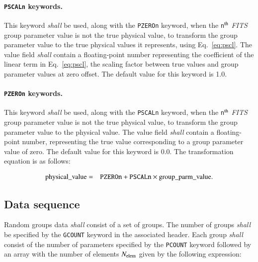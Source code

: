 \documentclass[onecolumn]{aa}
\begin{document}
   \paragraph{{\tt PSCALn} keywords.}
    \label{s:pscl}
   This keyword {\em shall} be used, along
   with the {\tt PZEROn}
   keyword, when the {\tt n}$^{\rm th}$ {\em FITS\/} group parameter 
   value is not the true
   physical value, to transform the 
   group parameter value to the true physical values it represents, 
   using Eq.~\ref{eq:pscl}. 
   The value field {\em shall} contain a floating-point number representing 
   the coefficient of the linear term in Eq.~\ref{eq:pscl}, the scaling 
   factor between true values and group parameter values 
   at zero offset.  The default value for this keyword is 1.0. 
  
   \paragraph{{\tt PZEROn} keywords.}
   \label{s:pzer}
   This keyword {\em shall} be used, along
   with the {\tt PSCALn} keyword, when 
   the {\tt n}$^{\rm th}$ {\em FITS\/} group parameter 
   value is not the true physical
   value, to transform the group parameter value to the physical value.  
   The value field {\em shall} contain a floating-point number,
   representing the true value corresponding to a group
   parameter value of zero.  The default value for this keyword is 0.0.  
   The transformation equation is as follows: 

\begin{eqnarray}  
    \mbox{physical\_value} & = & \mbox{{\tt PZEROn}} + \mbox{{\tt PSCALn}} 
                        \times \mbox{group\_parm\_value}. \label{eq:pscl}
\end{eqnarray}  
  
\subsection{Data sequence}
 \label{s:grdata}
  Random groups data {\em shall} consist of a set of groups.  The number of
  groups {\em shall} be specified by the {\tt GCOUNT} keyword in the associated
  header.  Each group {\em shall} consist of the number
  of
  parameters specified by the {\tt PCOUNT} 
  keyword followed by an array with the number of 
  elements $N_{\rm elem}$  given 
  by the following
  expression:
\end{document}
